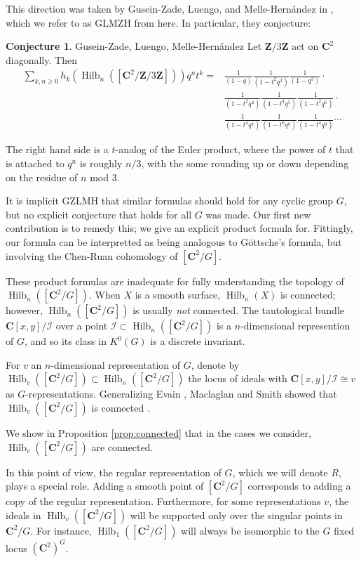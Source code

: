 \documentclass{amsart}[12pt]
\theoremstyle{definition}
\newtheorem{conjecture}[dummy]{Conjecture}
\newcommand{\Z}{\mathbf{Z}}
\newcommand{\C}{\mathbf{C}}
\newcommand{\II}{\mathcal{I}}
\DeclareMathOperator{\Hilb}{Hilb}
\begin{document}
This direction was taken by Gusein-Zade, Luengo, and Melle-Hern\'andez in \cite{GLM}, which we refer to as GLMZH from here.  In particular, they conjecture:

\begin{conjecture}{Gusein-Zade, Luengo, Melle-Hern\'andez}
Let $\Z/3\Z$ act on $\C^2$ diagonally.  Then
\begin{equation*}
\begin{split}
\sum_{k, n\geq 0} h_k(\Hilb_n([\C^2/\Z/3\Z]))q^nt^k =&\frac{1}{(1-q)}
\frac{1}{(1-t^2q^2)}\frac{1}{(1-q^3)} \cdot \\
&\frac{1}{(1-t^2q^4)}\frac{1}{(1-t^4q^5)}\frac{1}{(1-t^2q^6)}\cdot \\
&\frac{1}{(1-t^4q^7)}\frac{1}{(1-t^6q^8)}\frac{1}{(1-t^4q^9)}\cdots
\end{split}
\end{equation*}
\end{conjecture}

The right hand side is a $t$-analog of the Euler product, where the power of $t$ that is attached to $q^n$ is roughly $n/3$, with the some rounding up or down depending on the residue of $n$ mod 3.

It is implicit GZLMH that similar formulas should hold for any cyclic group $G$, but no explicit conjecture that holds for all $G$ was made.  Our first new contribution is to remedy this; we give an explicit product formula for.  Fittingly, our formula can be interpretted as being analogous to G\"ottsche's formula, but involving the Chen-Ruan cohomology of $[\C^2/G]$.

These product formulas are inadequate for fully understanding the topology of $\Hilb_n([\C^2/G])$.  When $X$ is a smooth surface, $\Hilb_n(X)$ is connected; however, $\Hilb_n([\C^2/G])$ is usually \emph{not} connected.  The tautological bundle $\C[x,y]/\II$ over a point $\II\subset\Hilb_n([\C^2/G])$ is a $n$-dimensional represention of $G$, and so its class in $K^0(G)$ is a discrete invariant.

For $v$ an $n$-dimensional representation of $G$, denote by $\Hilb_v([\C^2/G])\subset \Hilb_n([\C^2/G])$ the locus of ideals with $\C[x,y]/\II\cong v$ as $G$-representations.  Generalizing Evain \cite{evain1}, Maclaglan and Smith showed that $\Hilb_v([\C^2/G])$ is connected \cite{MS}.

We show in Proposition \ref{prop:connected} that in the cases we consider, $\Hilb_v([\C^2/G])$ are connected.  

In this point of view, the regular representation of $G$, which we will denote $R$, plays a special role.  Adding a smooth point of $[\C^2/G]$ corresponds to adding a copy of the regular representation.  Furthermore, for some representations $v$, the ideals in $\Hilb_v([\C^2/G])$ will be supported only over the singular points in $\C^2/G$.  For instance, $\Hilb_1([\C^2/G])$ will always be isomorphic to the $G$ fixed locus $(\C^2)^G$.
\end{document}
